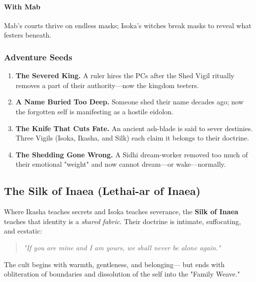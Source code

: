 \documentclass[11pt]{book}
\begin{document}
\paragraph{With Mab}
Mab's courts thrive on endless masks; Isoka's witches break masks to reveal what festers beneath.

\subsubsection{Adventure Seeds}

\begin{enumerate}[leftmargin=*]
    \item \textbf{The Severed King.}  
    A ruler hires the PCs after the Shed Vigil ritually removes a part of their authority---now the kingdom teeters.

    \item \textbf{A Name Buried Too Deep.}  
    Someone shed their name decades ago; now the forgotten self is manifesting as a hostile eidolon.

    \item \textbf{The Knife That Cuts Fate.}  
    An ancient ash-blade is said to sever destinies.  
    Three Vigils (Isoka, Ikasha, and Silk) each claim it belongs to their doctrine.

    \item \textbf{The Shedding Gone Wrong.}  
    A Sidhi dream-worker removed too much of their emotional "weight" and now cannot dream---or wake---normally.
\end{enumerate}

\subsection{The Silk of Inaea (Lethai-ar of Inaea)}

Where Ikasha teaches secrets and Isoka teaches severance, the \textbf{Silk of Inaea} teaches that identity is a \emph{shared fabric}.  
Their doctrine is intimate, suffocating, and ecstatic:  
\begin{quote}
    \emph{"If you are mine and I am yours, we shall never be alone again."}
\end{quote}

The cult begins with warmth, gentleness, and belonging---  
but ends with obliteration of boundaries and dissolution of the self into the "Family Weave."
\end{document}
